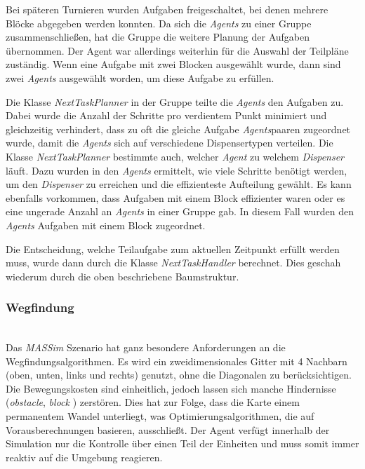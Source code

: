 Bei späteren Turnieren wurden Aufgaben freigeschaltet, bei denen mehrere Blöcke abgegeben werden konnten. Da sich die \textit{Agents} zu einer Gruppe zusammenschließen, hat die Gruppe die weitere Planung der Aufgaben übernommen. Der Agent war allerdings weiterhin für die Auswahl der Teilpläne zuständig.
Wenn eine Aufgabe mit zwei Blocken ausgewählt wurde, dann sind zwei \textit{Agents} ausgewählt worden, um diese Aufgabe zu erfüllen. 

Die Klasse \textit{NextTaskPlanner} in der Gruppe teilte die \textit{Agents} den Aufgaben zu. Dabei wurde die Anzahl der Schritte pro verdientem Punkt minimiert und gleichzeitig verhindert, dass zu oft die gleiche Aufgabe \textit{Agents}paaren zugeordnet wurde, damit die \textit{Agents} sich auf verschiedene Dispensertypen verteilen. Die Klasse \textit{NextTaskPlanner} bestimmte auch, welcher \textit{Agent} zu welchem \textit{Dispenser} läuft. Dazu wurden in den \textit{Agents} ermittelt, wie viele Schritte benötigt werden, um den \textit{Dispenser} zu erreichen und die effizienteste Aufteilung gewählt.
Es kann ebenfalls vorkommen, dass Aufgaben mit einem Block effizienter waren oder es eine ungerade Anzahl an \textit{Agents} in einer Gruppe gab. In diesem Fall wurden den \textit{Agents} Aufgaben mit einem Block zugeordnet.

Die Entscheidung, welche Teilaufgabe zum aktuellen Zeitpunkt erfüllt werden muss, wurde dann durch die Klasse \textit{NextTaskHandler} berechnet. Dies geschah wiederum durch die oben beschriebene Baumstruktur. 

\subsubsection{Wegfindung} \label{kap:wegfindung} ~\\
Das \textit{MASSim} Szenario hat ganz besondere Anforderungen an die Wegfindungsalgorithmen. Es wird ein zweidimensionales Gitter mit 4 Nachbarn (oben, unten, links und rechts) genutzt, ohne die Diagonalen zu berücksichtigen. Die Bewegungskosten sind einheitlich, jedoch lassen sich manche Hindernisse (\textit{obstacle}, \textit{block} ) zerstören. Dies hat zur Folge, dass die Karte einem permanentem Wandel unterliegt, was Optimierungsalgorithmen, die auf Vorausberechnungen basieren, ausschließt. Der Agent verfügt innerhalb der Simulation nur die Kontrolle über einen Teil der Einheiten und muss somit immer reaktiv auf die Umgebung reagieren.\newline

